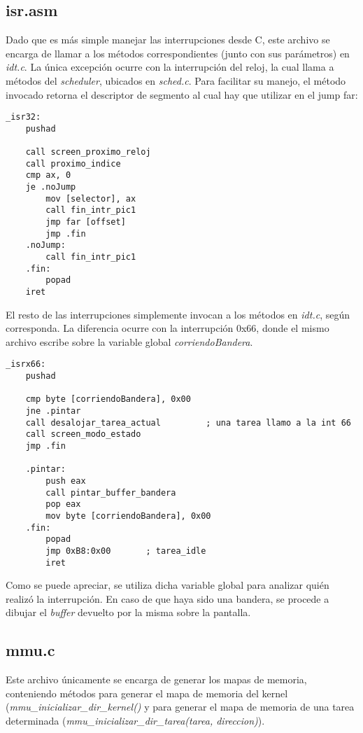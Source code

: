 \documentclass[a4paper]{article}
\newenvironment{codesnippet}{%
	\begin{Sbox}\begin{minipage}{\textwidth}\sffamily\small}%
	{\end{minipage}\end{Sbox}%
		\begin{center}%
		\vspace{-0.4cm}\colorbox{litegrey}{\TheSbox}\end{center}\vspace{0.3cm}}
\begin{document}
\subsection{isr.asm}
Dado que es más simple manejar las interrupciones desde C, este archivo se encarga de llamar a los métodos correspondientes (junto con sus parámetros) en \textit{idt.c}. La única excepción ocurre con la interrupción del reloj, la cual llama a métodos del \textit{scheduler}, ubicados en \textit{sched.c}. Para facilitar su manejo, el método invocado retorna el descriptor de segmento al cual hay que utilizar en el jump far:
\begin{codesnippet}
\begin{verbatim}
_isr32:
    pushad

    call screen_proximo_reloj
    call proximo_indice
    cmp ax, 0
    je .noJump
    	mov [selector], ax
    	call fin_intr_pic1
    	jmp far [offset]
    	jmp .fin
    .noJump:
    	call fin_intr_pic1
    .fin:
    	popad
    iret
\end{verbatim}
\end{codesnippet}


El resto de las interrupciones simplemente invocan a los métodos en \textit{idt.c}, según corresponda. La diferencia ocurre con la interrupción 0x66, donde el mismo archivo escribe sobre la variable global \textit{corriendoBandera}.

\begin{codesnippet}
\begin{verbatim}
_isrx66:
    pushad

    cmp byte [corriendoBandera], 0x00
    jne .pintar
    call desalojar_tarea_actual         ; una tarea llamo a la int 66
    call screen_modo_estado
    jmp .fin

    .pintar:
        push eax
        call pintar_buffer_bandera
        pop eax
        mov byte [corriendoBandera], 0x00
    .fin:
        popad
        jmp 0xB8:0x00       ; tarea_idle
        iret
\end{verbatim}
\end{codesnippet}

Como se puede apreciar, se utiliza dicha variable global para analizar quién realizó la interrupción. En caso de que haya sido una bandera, se procede a dibujar el \textit{buffer} devuelto por la misma sobre la pantalla.

\subsection{mmu.c}
Este archivo únicamente se encarga de generar los mapas de memoria, conteniendo métodos para generar el mapa de memoria del kernel (\textit{mmu_inicializar_dir_kernel()} y para generar el mapa de memoria de una tarea determinada (\textit{mmu_inicializar_dir_tarea(tarea, direccion)}). 
\end{document}
